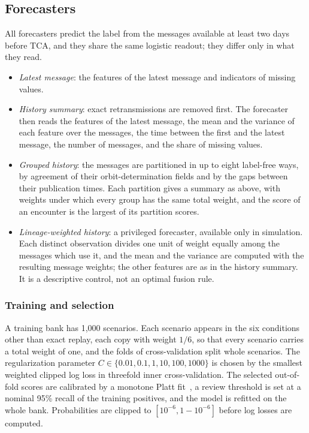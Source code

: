 \documentclass[conference]{IEEEtran}
\begin{document}
\subsection{Forecasters}

All forecasters predict the label from the messages available at least two days before TCA, and they share the same logistic readout; they differ only in what they read.
\begin{itemize}
\item \emph{Latest message}: the features of the latest message and indicators of missing values.
\item \emph{History summary}: exact retransmissions are removed first. The forecaster then reads the features of the latest message, the mean and the variance of each feature over the messages, the time between the first and the latest message, the number of messages, and the share of missing values.
\item \emph{Grouped history}: the messages are partitioned in up to eight label-free ways, by agreement of their orbit-determination fields and by the gaps between their publication times. Each partition gives a summary as above, with weights under which every group has the same total weight, and the score of an encounter is the largest of its partition scores.
\item \emph{Lineage-weighted history}: a privileged forecaster, available only in simulation. Each distinct observation divides one unit of weight equally among the messages which use it, and the mean and the variance are computed with the resulting message weights; the other features are as in the history summary. It is a descriptive control, not an optimal fusion rule.
\end{itemize}

\subsubsection*{Training and selection}
A training bank has 1,000 scenarios. Each scenario appears in the six conditions other than exact replay, each copy with weight $1/6$, so that every scenario carries a total weight of one, and the folds of cross-validation split whole scenarios. The regularization parameter $C\in\{0.01,0.1,1,10,100,1000\}$ is chosen by the smallest weighted clipped log loss in threefold inner cross-validation. The selected out-of-fold scores are calibrated by a monotone Platt fit~\cite{platt1999}, a review threshold is set at a nominal 95\% recall of the training positives, and the model is refitted on the whole bank. Probabilities are clipped to $[10^{-6},1-10^{-6}]$ before log losses are computed.
\end{document}

